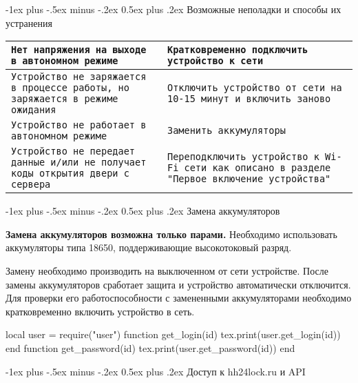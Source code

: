 \documentclass[a4paper,10pt,landscape]{article}
\makeatletter
\renewcommand{\section}{\@startsection{section}{1}{0mm}%
                                {-1ex plus -.5ex minus -.2ex}%
                                {0.5ex plus .2ex}%
                                {\normalfont\large\bfseries}}
\makeatother
\begin{document}
\begin{multicols}{3}
\section{Возможные неполадки и способы их устранения}

\noindent\begin{tabular}{p{4cm}|p{4cm}}
\hline
\texttt{Нет напряжения на выходе в автономном режиме}&\texttt{Кратковременно подключить устройство к сети}\\
\hline
\texttt{Устройство не заряжается в процессе работы, но заряжается в режиме ожидания}&\texttt{Отключить устройство от сети на 10-15 минут и включить заново}\\
\hline
\texttt{Устройство не работает в автономном режиме}&\texttt{Заменить аккумуляторы}\\
\hline
\texttt{Устройство не передает данные и/или не получает коды открытия двери с сервера}&\texttt{Переподключить устройство к Wi-Fi сети как описано в разделе "Первое включение устройства"}\\
\hline
\end{tabular}

\section{Замена аккумуляторов}

\textbf{Замена аккумуляторов возможна только парами.} Необходимо использовать аккумуляторы типа 18650, поддерживающие высокотоковый разряд. 

Замену необходимо производить на выключенном от сети устройстве. После замены аккумуляторов сработает защита и устройство автоматически отключится. Для проверки его работоспособности с замененными аккумуляторами необходимо кратковременно включить устройство в сеть. 

\begin{luacode}
local user = require("user")
	function get_login(id)
		tex.print(user.get_login(id))
	end
	function get_password(id)
		tex.print(user.get_password(id))
	end
\end{luacode}

\section{Доступ к hh24lock.ru и API}


\end{multicols}
\end{document}
